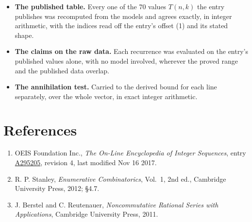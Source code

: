 \documentclass[11pt]{article}
\theoremstyle{definition}
\begin{document}
\begin{itemize}

\item {\bfseries The published table.} Every one of the 70 values $T(n,k)$ the entry publishes was recomputed from the models and agrees exactly, in integer arithmetic, with the indices read off the entry's offset (1) and its stated shape.

\item {\bfseries The claims on the raw data.} Each recurrence was evaluated on the entry's published values alone, with no model involved, wherever the proved range and the published data overlap.

\item {\bfseries The annihilation test.} Carried to the derived bound for each line separately, over the whole vector, in exact integer arithmetic.

\end{itemize}

\section{References}

\begin{enumerate}

\item OEIS Foundation Inc., \emph{The On-Line Encyclopedia of Integer Sequences}, entry \href{https://oeis.org/A295205}{A295205}, revision 4, last modified Nov 16 2017.

\item R. P. Stanley, \emph{Enumerative Combinatorics}, Vol.~1, 2nd ed., Cambridge University Press, 2012; \S4.7.

\item J. Berstel and C. Reutenauer, \emph{Noncommutative Rational Series with Applications}, Cambridge University Press, 2011.

\end{enumerate}
\end{document}
